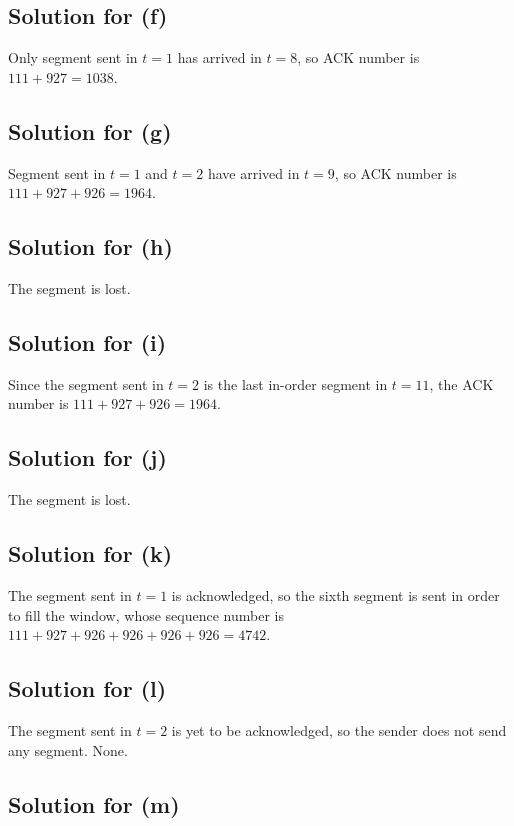 \documentclass{scrartcl}
\begin{document}
\subsection{Solution for (f)}

Only segment sent in \(t = 1\) has arrived in \(t = 8\), so ACK number is \(111
+ 927 = 1038\).

\subsection{Solution for (g)}

Segment sent in \(t = 1\) and \(t = 2\) have arrived in \(t = 9\), so ACK number
is \(111 + 927 + 926 = 1964\).

\subsection{Solution for (h)}

The segment is lost.

\subsection{Solution for (i)}

Since the segment sent in \(t = 2\) is the last in-order segment in \(t = 11\),
the ACK number is \(111 + 927 + 926 = 1964\).

\subsection{Solution for (j)}

The segment is lost.

\subsection{Solution for (k)}

The segment sent in \(t = 1\) is acknowledged, so the sixth segment is sent in
order to fill the window, whose sequence number is \(111 + 927 + 926 + 926 + 926
+ 926 = 4742\).

\subsection{Solution for (l)}

The segment sent in \(t = 2\) is yet to be acknowledged, so the sender does not
send any segment. None.

\subsection{Solution for (m)}
\end{document}
